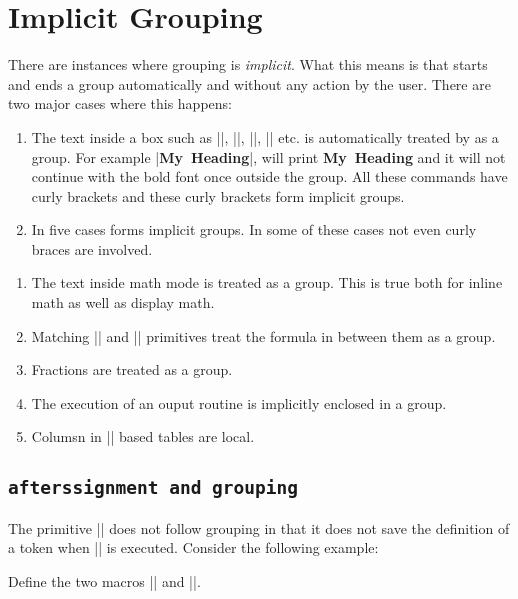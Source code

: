 \section{Implicit Grouping}

There are  instances where grouping is \textit{implicit}. What this means is that \text starts and ends a group automatically and without any action by the user. There are two major cases where this happens:

\begin{enumerate}
\item The text inside a box such as |\hbox|, |\vbox|, |\vtop|, |\vcenter| etc. is automatically treated by \tex as a group.  For example |\hbox{\bf My Heading}|, will print  \hbox{\bf My Heading}  and it will not continue with the bold font once outside the group. All these commands have curly brackets and these curly brackets form implicit groups.
\item In five cases \tex forms implicit groups. In some of these cases not even curly braces are involved.
\end{enumerate}

\begin{enumerate}
\item The text inside math mode is treated as a group. This is true both for inline math as well as display math.
\item Matching |\left| and |\right| primitives treat the formula in between them as a group.
\item Fractions are treated as a group.
\item The execution of an ouput routine is implicitly enclosed in a group.
\item Columsn in |\halign| based tables are local.
\end{enumerate} 

\subsection{\texttt{afterssignment and grouping}}

The primitive |\afterasignment| does not follow grouping in that it does not save the definition of a token when |\afterassignment| is executed. Consider the following example:

Define the two macros |\xx| and |\yy|.

\def\xx{\string\xx\ executed\par }

\def\yy{\string\yy\ executed\par }

